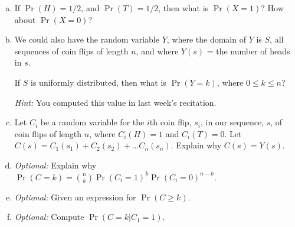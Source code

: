 \documentclass[12pt,letterpaper]{article}
\newenvironment{22enumerate}{\begin{enumerate}[a.]\itemsep0em}{\end{enumerate}}
\newif\ifsol
\newcommand{\solu}[2]{ \begin{mdframed} \ifsol #2 \else \vspace{#1} \fi \end{mdframed} }
\begin{document}
\begin{22enumerate}
    \item If $\Pr(H) = 1/2$, and $\Pr(T) = 1/2$, then what is $\Pr(X = 1)$? How about $\Pr(X = 0)$? 

    \solu{1cm}{$1/2$, $1/2$}

    \item We could also have the random variable $Y$, where the domain of $Y$ is $S$, all sequences of coin flips of length $n$, and where $Y(s)$ = the number of heads in $s$.  

    If $S$ is uniformly distributed, then what is $\Pr(Y = k)$, where $0 \leq k \leq n$?
    
    \textit{Hint:} You computed this value in last week's recitation.

    \solu{1cm}{$\binom{n}{k}/2^n$}
    
    \item Let $C_i$ be a random variable for the $i$th coin flip, $s_i$, in our sequence, $s$, of coin flips of length $n$, where $C_i(H) = 1$ and $C_i(T) = 0$. Let $C(s) = C_1(s_1) + C_2(s_2) + ... C_n(s_n)$. Explain why $C(s) = Y(s)$.

    \solu{1cm}{Think about $s$ as a 0/1 string. The sum of the digits in $s$ (which is what $C(s)$ is) is the number of 1s (that is, heads) we got in $s$ (which is what $Y(s)$ is)}

    \item \textit{Optional:} Explain why $\Pr(C = k) = \binom{n}{k}\Pr(C_i = 1)^k \Pr(C_i = 0)^{n - k}$. 

    \solu{2cm}{There are two ways to see it. We could show it reduces to $\binom{n}{k}/2^n$, and because $\Pr(Y = k) = \Pr(C = k)$, we are done. Or we could be a bit more general and explain that there are $\binom{n}{k}$ ways to choose $k$ 1's, and so we sum up the probabilities of these different ways}

    \item \textit{Optional:} Given an expression for $\Pr(C \geq k)$. 

    \solu{1cm}{$\sum_{j=k}^{n} \binom{n}{j} \times \Pr(C_i = 1)^j \times \Pr(C_i=0)^{n-j}$}

    \item \textit{Optional:} Compute $\Pr(C = k | C_1 = 1)$. 

    \solu{1cm}{$\binom{n - 1}{k - 1}\Pr(C_i=1)^{k - 1}\Pr(C_i=0)^{n - 1 - (k - 1)}$}
    
\end{22enumerate}
\end{document}
